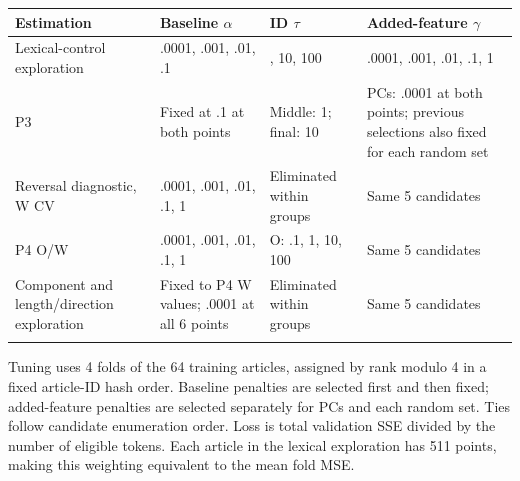 \begingroup
\fontsize{9.3}{12}\selectfont\setlength{\tabcolsep}{3.3pt}
{
\begin{longtable}[]{@{}
  >{\raggedright\arraybackslash}p{}
  >{\raggedright\arraybackslash}p{}
  >{\raggedright\arraybackslash}p{}
  >{\raggedright\arraybackslash}p{}@{}}
\toprule\noalign{}
\begin{minipage}[b]{\linewidth}\raggedright
Estimation
\end{minipage} & \begin{minipage}[b]{\linewidth}\raggedright
Baseline \(\alpha\)
\end{minipage} & \begin{minipage}[b]{\linewidth}\raggedright
ID \(\tau\)
\end{minipage} & \begin{minipage}[b]{\linewidth}\raggedright
Added-feature \(\gamma\)
\end{minipage} \\
\midrule\noalign{}
\endhead
\bottomrule\noalign{}
\endlastfoot
Lexical-control exploration & .0001, .001, .01, .1 & 1, 10, 100 & .0001, .001, .01, .1, 1 \\*
P3 & Fixed at .1 at both points & Middle: 1; final: 10 & PCs: .0001 at both points; previous selections also fixed for each random set \\*
Reversal diagnostic, W CV & .0001, .001, .01, .1, 1 & Eliminated within groups & Same 5 candidates \\*
P4 O/W & .0001, .001, .01, .1, 1 & O: .1, 1, 10, 100 & Same 5 candidates \\*
Component and length/direction exploration & Fixed to P4 W values; .0001 at all 6 points & Eliminated within groups & Same 5 candidates \\*
\end{longtable}
}
\endgroup

Tuning uses 4 folds of the 64 training articles, assigned by rank modulo 4 in a fixed article-ID hash order. Baseline penalties are selected first and then fixed; added-feature penalties are selected separately for PCs and each random set. Ties follow candidate enumeration order. Loss is total validation SSE divided by the number of eligible tokens. Each article in the lexical exploration has 511 points, making this weighting equivalent to the mean fold MSE.


